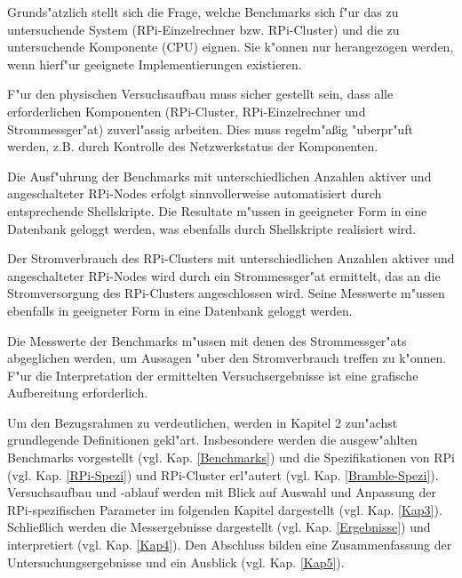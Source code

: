 Grunds"atzlich stellt sich die Frage, welche Benchmarks sich f"ur das zu untersuchende System (RPi-Einzelrechner bzw. RPi-Cluster) und die zu untersuchende Komponente (CPU) eignen. Sie k"onnen nur herangezogen werden, wenn hierf"ur geeignete Implementierungen existieren. 

F"ur den physischen Versuchsaufbau muss sicher gestellt sein, dass alle erforderlichen Komponenten (RPi-Cluster, RPi-Einzelrechner und Strommessger"at) zuverl"assig arbeiten. Dies muss regelm"a\ss ig "uberpr"uft werden, z.B. durch Kontrolle des Netzwerkstatus der Komponenten.  

Die Ausf"uhrung der Benchmarks mit unterschiedlichen Anzahlen aktiver und angeschalteter RPi-Nodes erfolgt sinnvollerweise automatisiert durch entsprechende Shellskripte. Die Resultate m"ussen in geeigneter Form in eine Datenbank geloggt werden, was ebenfalls durch Shellskripte realisiert wird. 

Der Stromverbrauch des RPi-Clusters mit unterschiedlichen Anzahlen aktiver und angeschalteter RPi-Nodes wird durch ein Strommessger"at ermittelt, das an die Stromversorgung des RPi-Clusters angeschlossen wird. Seine Messwerte m"ussen ebenfalls in geeigneter Form in eine Datenbank geloggt werden.  

Die Messwerte der Benchmarks m"ussen mit denen des Strommessger"ats abgeglichen werden, um Aussagen "uber den Stromverbrauch treffen zu k"onnen. F"ur die Interpretation der ermittelten Versuchsergebnisse ist eine grafische Aufbereitung erforderlich.

Um den Bezugsrahmen zu verdeutlichen, werden in Kapitel 2 zun"achst grundlegende Definitionen gekl"art. Insbesondere werden die ausgew"ahlten Benchmarks vorgestellt (vgl. Kap. \ref{Benchmarks}) und die Spezifikationen von RPi (vgl. Kap. \ref{RPi-Spezi}) und RPi-Cluster erl"autert (vgl. Kap. \ref{Bramble-Spezi}). Versuchsaufbau und -ablauf werden mit Blick auf Auswahl und Anpassung der RPi-spezifischen Parameter im folgenden Kapitel dargestellt (vgl. Kap. \ref{Kap3}). Schlie\ss lich  werden die Messergebnisse dargestellt (vgl. Kap. \ref{Ergebnisse}) und interpretiert (vgl. Kap. \ref{Kap4}). Den Abschluss bilden eine Zusammenfassung der Untersuchungsergebnisse und ein Ausblick (vgl. Kap. \ref{Kap5}).

\endinput 
